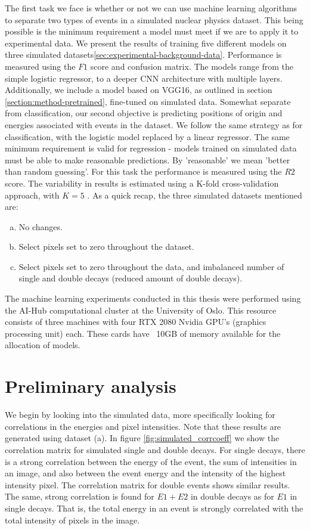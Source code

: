 \noindent The first task we face is whether or not we can use machine learning algorithms to 
separate two types of events in a simulated nuclear physics dataset. This being possible
is the minimum requirement a model must meet if we are to apply it to experimental data.
We present the results of training five different models on three simulated 
datasets\ref{sec:experimental-background-data}.
Performance is measured using the $F1$ score and confusion matrix. The models range from
the simple logistic regressor, to a deeper CNN architecture with multiple layers. Additionally,
we include a model based on VGG16, as outlined in section \ref{section:method-pretrained},
fine-tuned on simulated data. Somewhat separate from classification, our second objective
is predicting positions of origin and energies associated with events in the dataset.
We follow the same strategy as for classification, with the logistic model replaced by a linear
regressor. The same minimum requirement is valid for regression - models trained on simulated data
must be able to make reasonable predictions. By 'reasonable' we mean 'better than random guessing'.
For this task the performance is measured using the $R2$ score. The variability in results is 
estimated using a K-fold cross-validation approach, with $K = 5$ \cite{Stone1974}.
As a quick recap, the three simulated datasets mentioned are:
\begin{enumerate}[(a)]
    \item No changes.
    \item Select pixels set to zero throughout the dataset.
    \item Select pixels set to zero throughout the data, and imbalanced number of single
    and double decays (reduced amount of double decays).
\end{enumerate}

\noindent The machine learning experiments conducted in this thesis were performed
using the AI-Hub computational cluster at the University of Oslo. This resource 
consists of three machines with four RTX 2080 Nvidia GPU’s (graphics
processing unit) each. These cards have ~10GB of memory available for the
allocation of models.

\section{Preliminary analysis}
We begin by looking into the simulated data, more specifically looking for correlations
in the energies and pixel intensities. Note that these results are generated using
dataset (a). In figure \ref{fig:simulated_corrcoeff} we show
the correlation matrix for simulated single and double decays. For single decays, there
is a strong correlation between the energy of the event, the sum of intensities in an image,
and also between the event energy and the intensity of the highest intensity pixel.
The correlation matrix for double events shows similar results. The same, strong correlation
is found for $E1 + E2$ in double decays as for $E1$ in single decays. That is, the total energy
in an event is strongly correlated with the total intensity of pixels in the image.


